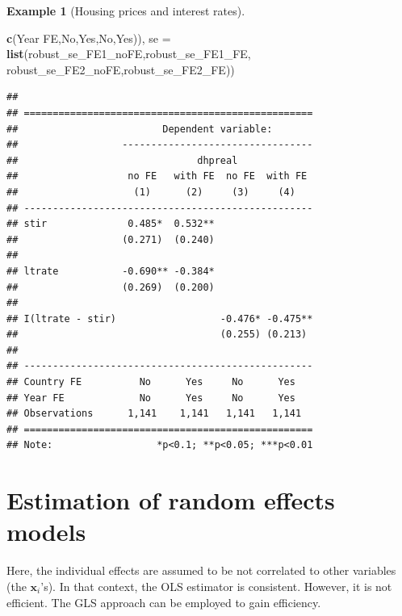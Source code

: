 \documentclass[
  12pt,
]{book}
\newenvironment{Shaded}{\begin{snugshade}}{\end{snugshade}}
\newcommand{\AttributeTok}[1]{\textcolor[rgb]{0.13,0.29,0.53}{#1}}
\newcommand{\FunctionTok}[1]{\textcolor[rgb]{0.13,0.29,0.53}{\textbf{#1}}}
\newcommand{\NormalTok}[1]{#1}
\newcommand{\StringTok}[1]{\textcolor[rgb]{0.31,0.60,0.02}{#1}}
\theoremstyle{definition}
\theoremstyle{definition}
\newtheorem{example}{Example}[chapter]
\theoremstyle{definition}
\theoremstyle{definition}
\theoremstyle{remark}
\begin{document}
\begin{example}[Housing prices and interest rates]
\begin{Shaded}
\begin{Highlighting}[]
                                    \FunctionTok{c}\NormalTok{(}\StringTok{\textquotesingle{}Year FE\textquotesingle{}}\NormalTok{,}\StringTok{\textquotesingle{}No\textquotesingle{}}\NormalTok{,}\StringTok{\textquotesingle{}Yes\textquotesingle{}}\NormalTok{,}\StringTok{\textquotesingle{}No\textquotesingle{}}\NormalTok{,}\StringTok{\textquotesingle{}Yes\textquotesingle{}}\NormalTok{)),}
                     \AttributeTok{se =} \FunctionTok{list}\NormalTok{(robust\_se\_FE1\_noFE,robust\_se\_FE1\_FE,}
\NormalTok{                               robust\_se\_FE2\_noFE,robust\_se\_FE2\_FE))}
\end{Highlighting}
\end{Shaded}

\begin{verbatim}
## 
## ==================================================
##                         Dependent variable:       
##                  ---------------------------------
##                               dhpreal             
##                   no FE   with FE  no FE  with FE 
##                    (1)      (2)     (3)     (4)   
## --------------------------------------------------
## stir              0.485*  0.532**                 
##                  (0.271)  (0.240)                 
##                                                   
## ltrate           -0.690** -0.384*                 
##                  (0.269)  (0.200)                 
##                                                   
## I(ltrate - stir)                  -0.476* -0.475**
##                                   (0.255) (0.213) 
##                                                   
## --------------------------------------------------
## Country FE          No      Yes     No      Yes   
## Year FE             No      Yes     No      Yes   
## Observations      1,141    1,141   1,141   1,141  
## ==================================================
## Note:                  *p<0.1; **p<0.05; ***p<0.01
\end{verbatim}

\end{example}

\hypertarget{RandomEffect}{%
\section{Estimation of random effects models}\label{RandomEffect}}

Here, the individual effects are assumed to be not correlated to other variables (the \(\mathbf{x}_i\)'s). In that context, the OLS estimator is consistent. However, it is not efficient. The GLS approach can be employed to gain efficiency.
\end{document}
